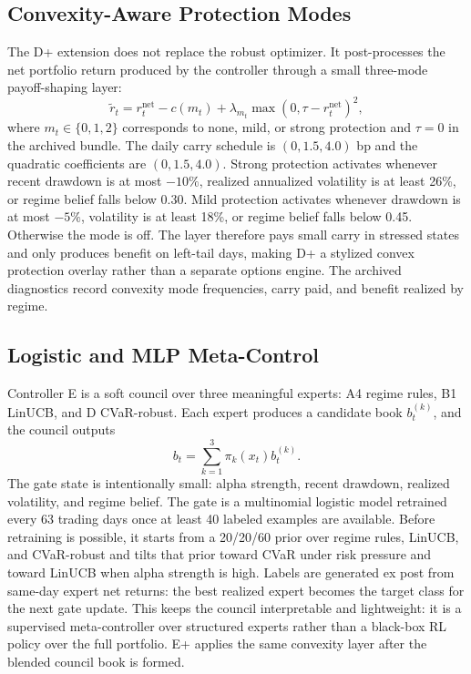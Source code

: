\documentclass[10pt,twocolumn]{article}
\begin{document}
\subsection{Convexity-Aware Protection Modes}

The D+ extension does not replace the robust optimizer. It post-processes the
net portfolio return produced by the controller through a small three-mode
payoff-shaping layer:
\[
\tilde r_t = r_t^{\mathrm{net}} - c(m_t)
+ \lambda_{m_t}\max(0,\tau-r_t^{\mathrm{net}})^2,
\]
where $m_t \in \{0,1,2\}$ corresponds to none, mild, or strong protection and
$\tau=0$ in the archived bundle. The daily carry schedule is $(0,1.5,4.0)$ bp
and the quadratic coefficients are $(0,1.5,4.0)$. Strong protection activates
whenever recent drawdown is at most $-10\%$, realized annualized volatility is
at least 26\%, or regime belief falls below 0.30. Mild protection activates
whenever drawdown is at most $-5\%$, volatility is at least 18\%, or regime
belief falls below 0.45. Otherwise the mode is off. The layer therefore pays
small carry in stressed states and only produces benefit on left-tail days,
making D+ a stylized convex protection overlay rather than a separate options
engine. The archived diagnostics record convexity mode frequencies, carry paid,
and benefit realized by regime.

\subsection{Logistic and MLP Meta-Control}

Controller E is a soft council over three meaningful experts: A4 regime rules,
B1 LinUCB, and D CVaR-robust. Each expert produces a candidate book
$b_t^{(k)}$, and the council outputs
\[
b_t = \sum_{k=1}^3 \pi_k(x_t)b_t^{(k)}.
\]
The gate state is intentionally small: alpha strength, recent drawdown,
realized volatility, and regime belief.
The gate is a multinomial logistic model retrained every 63 trading days once
at least 40 labeled examples are available. Before retraining is possible, it
starts from a 20/20/60 prior over regime rules, LinUCB, and CVaR-robust and
tilts that prior toward CVaR under risk pressure and toward LinUCB when alpha
strength is high. Labels are generated ex post from same-day expert net
returns: the best realized expert becomes the target class for the next gate
update. This keeps the council interpretable and lightweight: it is a
supervised meta-controller over structured experts rather than a black-box RL
policy over the full portfolio. E+ applies the same convexity layer after the
blended council book is formed.
\end{document}

